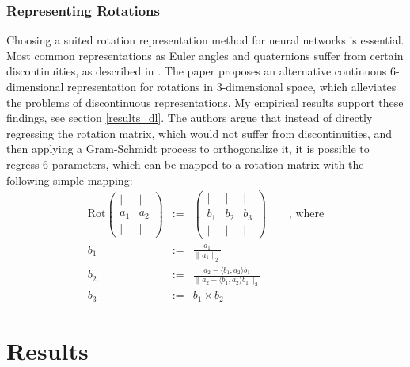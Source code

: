 \documentclass[12pt,a4paper]{article}
\begin{document}
\subsubsection{Representing Rotations}
\label{rotation_representation}
Choosing a suited rotation representation method for neural networks is essential. Most common representations as Euler angles and quaternions suffer from certain discontinuities, as described in \cite{rotation_representation}. The paper proposes an alternative continuous 6-dimensional representation for rotations in 3-dimensional space, which alleviates the problems of discontinuous representations.  My empirical results support these findings, see section \ref{results_dl}. The authors argue that instead of directly regressing the rotation matrix, which would not suffer from discontinuities, and then applying a Gram-Schmidt process to orthogonalize it, it is possible to regress 6 parameters, which can be mapped to a rotation matrix with the following simple mapping:
{
\begin{eqnarray*}
	\text{Rot}\begin{pmatrix}
		| & | \\
		a_1 & a_2 \\
		| & | 
	\end{pmatrix} &:=& \begin{pmatrix}
		| & | & |\\
		b_1 & b_2 & b_3\\
		| & | & |
	\end{pmatrix}
	\qquad \text{, where} \\
b_1 &:=& \frac{a_1}{\| a_1\|_2} \\
b_2 &:=& \frac{a_2 - \langle b_1, a_2\rangle b_1}{\| a_2 - \langle b_1, a_2\rangle b_1\|_2} \\
b_3 &:=& b_1 \times b_2
\end{eqnarray*}
}


\section{Results}
\label{results}
\end{document}
